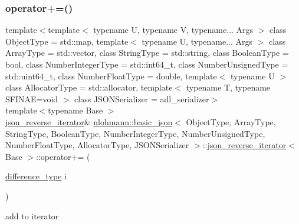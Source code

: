 \subsubsection{\texorpdfstring{operator+=()}{operator+=()}}
{\footnotesize\ttfamily template$<$template$<$ typename U, typename V, typename... Args $>$ class Object\+Type = std\+::map, template$<$ typename U, typename... Args $>$ class Array\+Type = std\+::vector, class String\+Type  = std\+::string, class Boolean\+Type  = bool, class Number\+Integer\+Type  = std\+::int64\+\_\+t, class Number\+Unsigned\+Type  = std\+::uint64\+\_\+t, class Number\+Float\+Type  = double, template$<$ typename U $>$ class Allocator\+Type = std\+::allocator, template$<$ typename T, typename S\+F\+I\+N\+A\+E=void $>$ class J\+S\+O\+N\+Serializer = adl\+\_\+serializer$>$ \\
template$<$typename Base $>$ \\
\mbox{\hyperlink{classnlohmann_1_1basic__json_1_1json__reverse__iterator}{json\+\_\+reverse\+\_\+iterator}}\& \mbox{\hyperlink{classnlohmann_1_1basic__json}{nlohmann\+::basic\+\_\+json}}$<$ Object\+Type, Array\+Type, String\+Type, Boolean\+Type, Number\+Integer\+Type, Number\+Unsigned\+Type, Number\+Float\+Type, Allocator\+Type, J\+S\+O\+N\+Serializer $>$\+::\mbox{\hyperlink{classnlohmann_1_1basic__json_1_1json__reverse__iterator}{json\+\_\+reverse\+\_\+iterator}}$<$ Base $>$\+::operator+= (\begin{DoxyParamCaption}\item[{\mbox{\hyperlink{classnlohmann_1_1basic__json_afe7c1303357e19cea9527af4e9a31d8f}{difference\+\_\+type}}}]{i }\end{DoxyParamCaption})\hspace{0.3cm}{\ttfamily [inline]}}



add to iterator 

\mbox{\label{classnlohmann_1_1basic__json_1_1json__reverse__iterator_a99b0f5e39f0edc9311e28d06e4f28db8}} 
